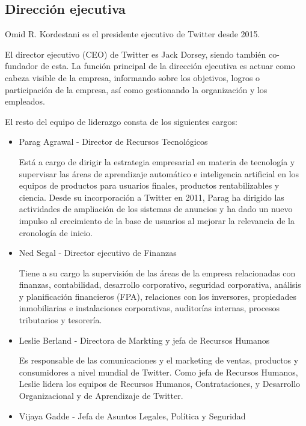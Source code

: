 \subsection{Dirección ejecutiva}

Omid R. Kordestani es el presidente ejecutivo de Twitter desde 2015.

El director ejecutivo (CEO) de Twitter es Jack Dorsey, siendo también co-fundador de esta. 
La función principal de la dirección ejecutiva es actuar como cabeza visible de la empresa, informando sobre los objetivos, logros o participación de la empresa, así como gestionando la organización y los empleados.

El resto del equipo de liderazgo consta de los siguientes cargos:

\begin{itemize}

\item Parag Agrawal - Director de Recursos Tecnológicos

Está a cargo de dirigir la estrategia empresarial en materia de tecnología y supervisar las áreas de aprendizaje automático e inteligencia artificial en los equipos de productos para usuarios finales, productos rentabilizables y ciencia. Desde su incorporación a Twitter en 2011, Parag ha dirigido las actividades de ampliación de los sistemas de anuncios y ha dado un nuevo impulso al crecimiento de la base de usuarios al mejorar la relevancia de la cronología de inicio.  

\item Ned Segal - Director ejecutivo de Finanzas

Tiene a su cargo la supervisión de las áreas de la empresa relacionadas con finanzas, contabilidad, desarrollo corporativo, seguridad corporativa, análisis y planificación financieros (FPA), relaciones con los inversores, propiedades inmobiliarias e instalaciones corporativas, auditorías internas, procesos tributarios y tesorería.

\item Leslie Berland - Directora de Markting y jefa de Recursos Humanos

Es responsable de las comunicaciones y el marketing de ventas, productos y consumidores a nivel mundial de Twitter. Como jefa de Recursos Humanos, Leslie lidera los equipos de Recursos Humanos, Contrataciones, y Desarrollo Organizacional y de Aprendizaje de Twitter.

\item Vijaya Gadde - Jefa de Asuntos Legales, Política y Seguridad


\end{itemize}
